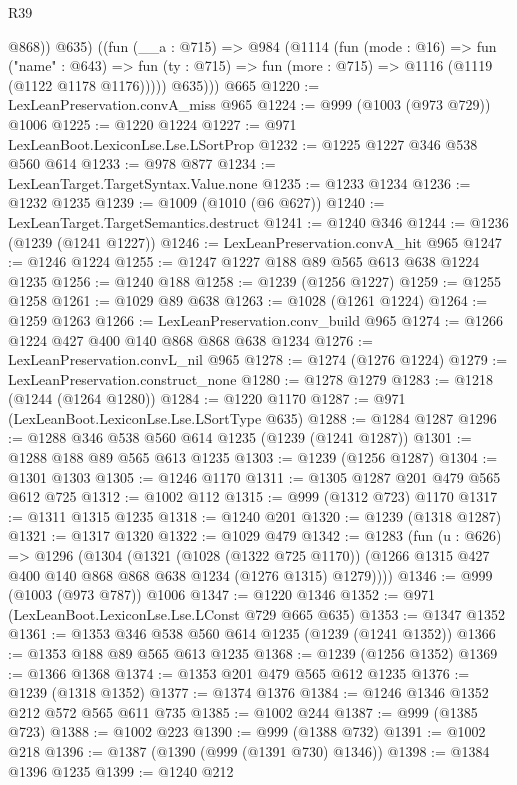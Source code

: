 \begin{lexlean}{R39}
\begin{coremodule}
            @868))
          @635)
        ((fun (__a : @715) =>
        @984
          (@1114
            (fun (mode : @16) =>
            fun ("name" : @643) =>
            fun (ty : @715) => fun (more : @715) => @1116 (@1119 (@1122 @1178 @1176)))))
          @635)))
    @665
@1220 := LexLeanPreservation.convA_miss @965
@1224 := @999 (@1003 (@973 @729)) @1006
@1225 := @1220 @1224
@1227 := @971 LexLeanBoot.LexiconLse.Lse.LSortProp
@1232 := @1225 @1227 @346 @538 @560 @614
@1233 := @978 @877
@1234 := LexLeanTarget.TargetSyntax.Value.none
@1235 := @1233 @1234
@1236 := @1232 @1235
@1239 := @1009 (@1010 (@6 @627))
@1240 := LexLeanTarget.TargetSemantics.destruct
@1241 := @1240 @346
@1244 := @1236 (@1239 (@1241 @1227))
@1246 := LexLeanPreservation.convA_hit @965
@1247 := @1246 @1224
@1255 := @1247 @1227 @188 @89 @565 @613 @638 @1224 @1235
@1256 := @1240 @188
@1258 := @1239 (@1256 @1227)
@1259 := @1255 @1258
@1261 := @1029 @89 @638
@1263 := @1028 (@1261 @1224)
@1264 := @1259 @1263
@1266 := LexLeanPreservation.conv_build @965
@1274 := @1266 @1224 @427 @400 @140 @868 @868 @638 @1234
@1276 := LexLeanPreservation.convL_nil @965
@1278 := @1274 (@1276 @1224)
@1279 := LexLeanPreservation.construct_none
@1280 := @1278 @1279
@1283 := @1218 (@1244 (@1264 @1280))
@1284 := @1220 @1170
@1287 := @971 (LexLeanBoot.LexiconLse.Lse.LSortType @635)
@1288 := @1284 @1287
@1296 := @1288 @346 @538 @560 @614 @1235 (@1239 (@1241 @1287))
@1301 := @1288 @188 @89 @565 @613 @1235
@1303 := @1239 (@1256 @1287)
@1304 := @1301 @1303
@1305 := @1246 @1170
@1311 := @1305 @1287 @201 @479 @565 @612 @725
@1312 := @1002 @112
@1315 := @999 (@1312 @723) @1170
@1317 := @1311 @1315 @1235
@1318 := @1240 @201
@1320 := @1239 (@1318 @1287)
@1321 := @1317 @1320
@1322 := @1029 @479
@1342 := @1283
    (fun (u : @626) =>
    @1296
      (@1304
        (@1321
          (@1028 (@1322 @725 @1170))
          (@1266 @1315 @427 @400 @140 @868 @868 @638 @1234 (@1276 @1315) @1279))))
@1346 := @999 (@1003 (@973 @787)) @1006
@1347 := @1220 @1346
@1352 := @971 (LexLeanBoot.LexiconLse.Lse.LConst @729 @665 @635)
@1353 := @1347 @1352
@1361 := @1353 @346 @538 @560 @614 @1235 (@1239 (@1241 @1352))
@1366 := @1353 @188 @89 @565 @613 @1235
@1368 := @1239 (@1256 @1352)
@1369 := @1366 @1368
@1374 := @1353 @201 @479 @565 @612 @1235
@1376 := @1239 (@1318 @1352)
@1377 := @1374 @1376
@1384 := @1246 @1346 @1352 @212 @572 @565 @611 @735
@1385 := @1002 @244
@1387 := @999 (@1385 @723)
@1388 := @1002 @223
@1390 := @999 (@1388 @732)
@1391 := @1002 @218
@1396 := @1387 (@1390 (@999 (@1391 @730) @1346))
@1398 := @1384 @1396 @1235
@1399 := @1240 @212

\end{coremodule}
\end{lexlean}

